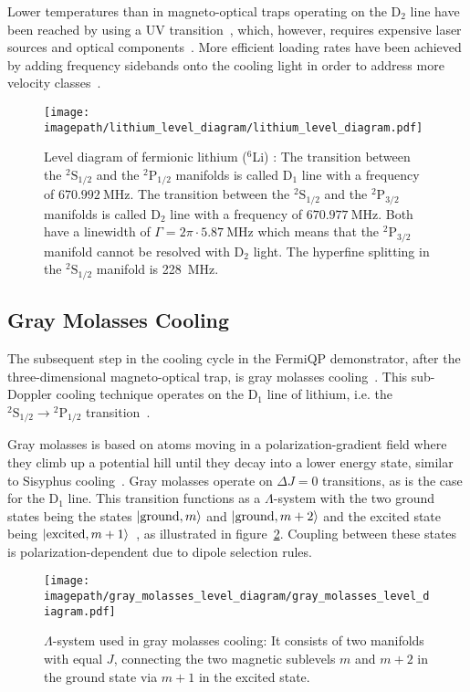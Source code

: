 Lower temperatures than in magneto-optical traps operating on the D$_2$ line have been reached by using a UV transition~\cite{duarte_all-optical_2011,omran_microscopic_2015}, which, however, requires expensive laser sources and optical components~\cite{burchianti_efficient_2014}. More efficient loading rates have been achieved by adding frequency sidebands onto the cooling light in order to address more velocity classes~\cite{li_enhanced_2015}.

\begin{figure}
    \centering
    \texttt{[image: \\imagepath/lithium\_level\_diagram/lithium\_level\_diagram.pdf]}
    \caption{Level diagram of fermionic lithium ($^6$Li) \cite{gehm_properties_2003, scherf_re-measurement_1996}: The transition between the  $^2\text{S}_{1/2}$ and the $^2\text{P}_{1/2}$ manifolds is called D$_1$ line with a frequency of $\SI{670.992}{\mega\hertz}$. The transition between the  $^2\text{S}_{1/2}$ and the $^2\text{P}_{3/2}$ manifolds is called D$_2$ line with a frequency of $\SI{670.977}{\mega\hertz}$. Both have a linewidth of $\Gamma = 2\pi \cdot \SI{5.87}{\mega\hertz}$ which means that the $^2\text{P}_{3/2}$ manifold cannot be resolved with D$_2$ light. The hyperfine splitting in the $^2\text{S}_{1/2}$ manifold is \SI{228}{\mega\hertz}.}
    \label{fig:lithium_level_diagram}
\end{figure}

\subsection*{Gray Molasses Cooling}
The subsequent step in the cooling cycle in the FermiQP demonstrator, after the three-dimensional magneto-optical trap, is gray molasses cooling~\cite{grynberg_proposal_1994,weidemuller_novel_1994}. This sub-Doppler cooling technique operates on the D$_1$ line of lithium, i.e. the $^2\text{S}_{1/2} \rightarrow {^2\text{P}_{1/2}}$ transition~\cite{burchianti_efficient_2014}.

Gray molasses is based on atoms moving in a polarization-gradient field where they climb up a potential hill until they decay into a lower energy state, similar to Sisyphus cooling~\cite{foot_atomic_2005}. Gray molasses operate on $\Delta J = 0$ transitions, as is the case for the D$_1$ line. This transition functions as a $\Lambda$-system with the two ground states being the states $\Ket{\text{ground}, m}$ and $\Ket{\text{ground}, m + 2}$ and the excited state being $\Ket{\text{excited}, m + 1}$~\cite{weidemuller_novel_1994}, as illustrated in figure~\ref{fig:gray_molasses_level_diagram}. Coupling between these states is polarization-dependent due to dipole selection rules.
\begin{figure}
    \centering
    \texttt{[image: \\imagepath/gray\_molasses\_level\_diagram/gray\_molasses\_level\_diagram.pdf]}
    \caption{$\Lambda$-system used in gray molasses cooling: It consists of two manifolds with equal $J$, connecting the two magnetic sublevels $m$ and $m+2$ in the ground state via $m+1$ in the excited state.}
    \label{fig:gray_molasses_level_diagram}
\end{figure}

